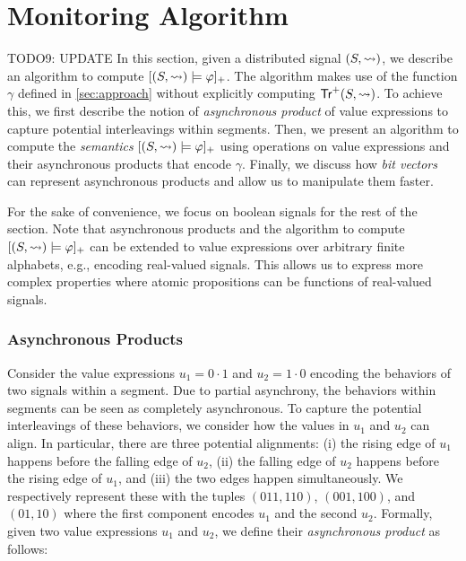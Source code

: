 \section{Monitoring Algorithm} \label{sec:algorithm}
\alert{TODO9: UPDATE}
In this section, given a distributed signal $(S,{\rightsquigarrow})$, we describe an algorithm to compute $[(S,{\rightsquigarrow}) \models \varphi]_+$.
The algorithm makes use of the function $\gamma$ defined in \cref{sec:approach} without explicitly computing $\mathsf{Tr}^+(S,{\rightsquigarrow})$.
To achieve this, we first describe the notion of \emph{asynchronous product} of value expressions to capture potential interleavings within segments.
Then, we present an algorithm to compute the \emph{semantics} $[(S,{\rightsquigarrow}) \models \varphi]_+$ using operations on value expressions and their asynchronous products that encode $\gamma$. 
Finally, we discuss how \emph{bit vectors} can represent asynchronous products and allow us to manipulate them faster.

\begin{remark}
	For the sake of convenience, we focus on boolean signals for the rest of the section.
	Note that asynchronous products and the algorithm to compute $[(S,{\rightsquigarrow}) \models \varphi]_+$ can be extended to value expressions over arbitrary finite alphabets, e.g., encoding real-valued signals.
	This allows us to express more complex properties where atomic propositions can be functions of real-valued signals.
\end{remark}

\subsubsection{Asynchronous Products}
Consider the value expressions $u_1 = 0 \cdot 1$ and $u_2 = 1 \cdot 0$ encoding the behaviors of two signals within a segment.
Due to partial asynchrony, the behaviors within segments can be seen as completely asynchronous.
To capture the potential interleavings of these behaviors, we consider how the values in $u_1$ and $u_2$ can align.
In particular, there are three potential alignments:
(i) the rising edge of $u_1$ happens before the falling edge of $u_2$,
(ii) the falling edge of $u_2$ happens before the rising edge of $u_1$, and
(iii) the two edges happen simultaneously.
We respectively represent these with the tuples $(011, 110)$, $(001, 100)$, and $(01, 10)$ where the first component encodes $u_1$ and the second $u_2$.
Formally, given two value expressions $u_1$ and $u_2$, we define their \emph{asynchronous product} as follows:

